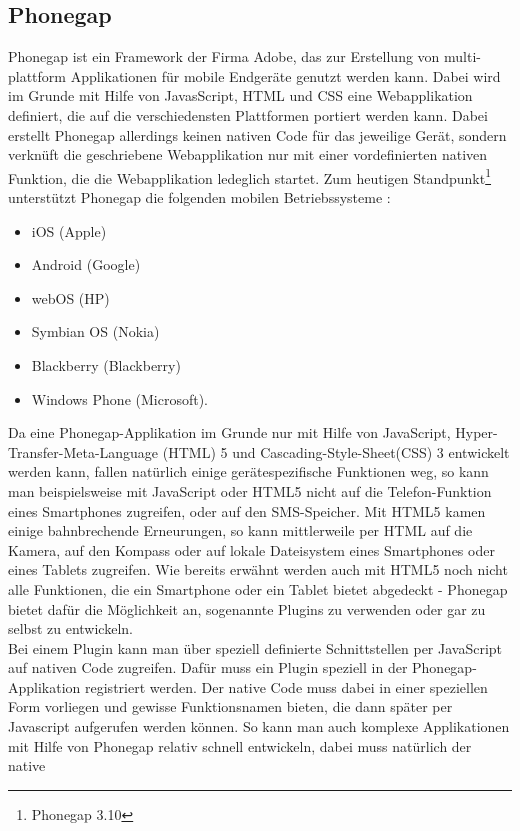 \documentclass[4paper,10pt]{article}
\begin{document}
\subsection{Phonegap}
Phonegap ist ein Framework der Firma Adobe, das zur Erstellung von
multi-plattform Applikationen für mobile Endgeräte genutzt werden kann. Dabei
wird im Grunde mit Hilfe von JavasScript, HTML und CSS eine Webapplikation
definiert, die auf die verschiedensten Plattformen portiert werden kann. Dabei erstellt Phonegap
allerdings keinen nativen Code für das jeweilige Gerät, sondern verknüft die
geschriebene Webapplikation nur mit einer vordefinierten nativen Funktion, die
die Webapplikation ledeglich startet. Zum heutigen Standpunkt\footnote{Phonegap
3.10} unterstützt Phonegap die folgenden mobilen Betriebssysteme : 
\begin{itemize}
		\item iOS (Apple)
		\item Android (Google)
		\item webOS (HP)
		\item Symbian OS (Nokia)
		\item Blackberry (Blackberry)
		\item Windows Phone (Microsoft).
	\end{itemize}
Da eine Phonegap-Applikation im Grunde nur mit Hilfe von JavaScript,
Hyper-Transfer-Meta-Language (HTML) 5 und Cascading-Style-Sheet(CSS) 3
entwickelt werden kann, fallen natürlich einige gerätespezifische Funktionen weg, so kann man beispielsweise mit JavaScript oder HTML5 nicht auf
die Telefon-Funktion eines Smartphones zugreifen, oder auf den SMS-Speicher. Mit
HTML5 kamen einige bahnbrechende Erneurungen, so kann mittlerweile per HTML auf
die Kamera, auf den Kompass oder auf lokale Dateisystem eines Smartphones oder
eines Tablets zugreifen. Wie bereits erwähnt werden auch mit HTML5 noch nicht
alle Funktionen, die ein Smartphone oder ein Tablet bietet abgedeckt - Phonegap
bietet dafür die Möglichkeit an, sogenannte Plugins zu verwenden oder gar zu
selbst zu entwickeln. \\
Bei einem Plugin kann man über speziell definierte Schnittstellen per JavaScript
auf nativen Code zugreifen. Dafür muss ein Plugin speziell in der
Phonegap-Applikation registriert werden. Der native Code muss dabei in einer
speziellen Form vorliegen und gewisse Funktionsnamen bieten, die dann später per
Javascript aufgerufen werden können. So kann man auch komplexe Applikationen mit
Hilfe von Phonegap relativ schnell entwickeln, dabei muss natürlich der native
\end{document}
